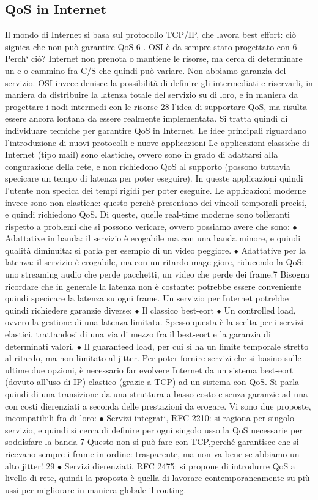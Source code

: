 \subsection{QoS in Internet}
Il mondo di Internet si basa sul protocollo TCP/IP, che lavora best effort: ciò
signica che non può garantire QoS 6 . OSI è da sempre stato progettato con
6 Perch` ciò? Internet non prenota o mantiene le risorse, ma cerca di determinare un
e o
cammino fra C/S che quindi può variare. Non abbiamo garanzia del servizio. OSI invece
denisce la possibilità di definire gli intermediati e riservarli, in maniera da distribuire la
latenza totale del servizio su di loro, e in maniera da progettare i nodi intermedi con le risorse
28
l'idea di supportare QoS, ma risulta essere ancora lontana da essere realmente
implementata. Si tratta quindi di individuare tecniche per garantire QoS in Internet. Le idee principali riguardano
l'introduzione di nuovi protocolli e nuove
applicazioni
Le applicazioni classiche di Internet (tipo mail) sono elastiche, ovvero sono
in grado di adattarsi alla congurazione della rete, e non richiedono QoS al
supporto (possono tuttavia specicare un tempo di latenza per poter eseguire).
In queste applicazioni quindi l'utente non specica dei tempi rigidi per poter
eseguire.
Le applicazioni moderne invece sono non elastiche: questo perché presentano
dei vincoli temporali precisi, e quindi richiedono QoS. Di queste, quelle real-time
moderne sono tolleranti rispetto a problemi che si possono vericare, ovvero
possiamo avere che sono:
$\bullet$ Adattative in banda: il servizio è erogabile ma con una banda minore, e
quindi qualità diminuita: si parla per esempio di un video peggiore.
$\bullet$ Adattative per la latenza: il servizio è erogabile, ma con un ritardo mage
giore, riducendo la QoS: uno streaming audio che perde pacchetti, un video
che perde dei frame.7
Bisogna ricordare che in generale la latenza non è costante: potrebbe essere
conveniente quindi specicare la latenza su ogni frame.
Un servizio per Internet potrebbe quindi richiedere garanzie diverse:
$\bullet$ Il classico best-eort
$\bullet$ Un controlled load, ovvero la gestione di una latenza limitata. Spesso
questa è la scelta per i servizi elastici, trattandosi di una via di mezzo fra
il best-eort e la garanzia di determinati valori.
$\bullet$ Il guaranteed load, per cui si ha un limite temporale stretto al ritardo, ma
non limitato al jitter.
Per poter fornire servizi che si basino sulle ultime due opzioni, è necessario
far evolvere Internet da un sistema best-eort (dovuto all'uso di IP) elastico
(grazie a TCP) ad un sistema con QoS. Si parla quindi di una transizione da
una struttura a basso costo e senza garanzie ad una con costi dierenziati a
seconda delle prestazioni da erogare. Vi sono due proposte, incompatibili fra di
loro:
$\bullet$ Servizi integrati, RFC 2210: si ragiona per singolo servizio, e quindi si
cerca di definire per ogni singolo usso la QoS
necessarie per soddisfare la banda
7 Questo non si può fare con TCP,perché garantisce che si ricevano sempre i frame in ordine:
trasparente, ma non va bene se abbiamo un alto jitter!
29
$\bullet$ Servizi dierenziati, RFC 2475: si propone di introdurre QoS a livello di
rete, quindi la proposta è quella di lavorare contemporaneamente su più
ussi per migliorare in maniera globale il routing.
